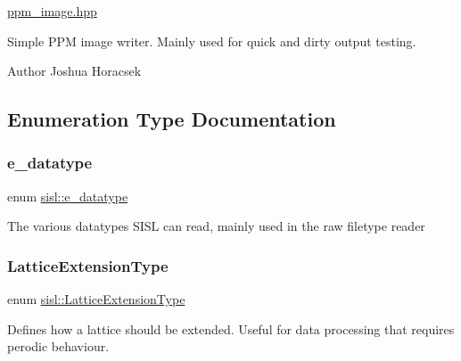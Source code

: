 \hyperlink{ppm__image_8hpp_source}{ppm\+\_\+image.\+hpp}

Simple P\+PM image writer. Mainly used for quick and dirty output testing.

\begin{DoxyAuthor}{Author}
Joshua Horacsek 
\end{DoxyAuthor}


\subsection{Enumeration Type Documentation}
\mbox{\label{namespacesisl_acb05df69c6b8f6d31074a5f4cec4baeb}} 
\subsubsection{\texorpdfstring{e\+\_\+datatype}{e\_datatype}}
{\footnotesize\ttfamily enum \hyperlink{namespacesisl_acb05df69c6b8f6d31074a5f4cec4baeb}{sisl\+::e\+\_\+datatype}}

The various datatypes S\+I\+SL can read, mainly used in the raw filetype reader \mbox{\label{namespacesisl_aaf1f41d23ed37dacaa4c9f1bb6d3324f}} 
\subsubsection{\texorpdfstring{Lattice\+Extension\+Type}{LatticeExtensionType}}
{\footnotesize\ttfamily enum \hyperlink{namespacesisl_aaf1f41d23ed37dacaa4c9f1bb6d3324f}{sisl\+::\+Lattice\+Extension\+Type}}



Defines how a lattice should be extended. Useful for data processing that requires perodic behaviour. 

